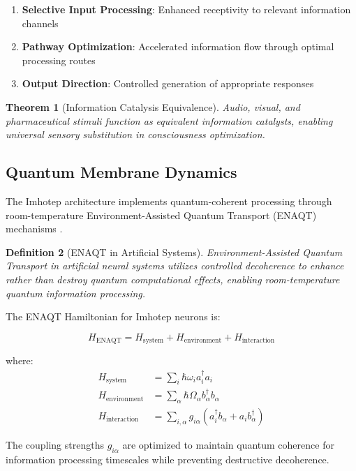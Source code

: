 \documentclass[12pt,a4paper]{article}
\newtheorem{theorem}{Theorem}[section]
\newtheorem{definition}[theorem]{Definition}
\theoremstyle{remark}
\begin{document}
\begin{enumerate}
\item \textbf{Selective Input Processing}: Enhanced receptivity to relevant information channels
\item \textbf{Pathway Optimization}: Accelerated information flow through optimal processing routes
\item \textbf{Output Direction}: Controlled generation of appropriate responses
\end{enumerate}

\begin{theorem}[Information Catalysis Equivalence]
Audio, visual, and pharmaceutical stimuli function as equivalent information catalysts, enabling universal sensory substitution in consciousness optimization.
\end{theorem}

\subsection{Quantum Membrane Dynamics}

The Imhotep architecture implements quantum-coherent processing through room-temperature Environment-Assisted Quantum Transport (ENAQT) mechanisms \cite{sachikonye2024membrane}.

\begin{definition}[ENAQT in Artificial Systems]
Environment-Assisted Quantum Transport in artificial neural systems utilizes controlled decoherence to enhance rather than destroy quantum computational effects, enabling room-temperature quantum information processing.
\end{definition}

The ENAQT Hamiltonian for Imhotep neurons is:

\begin{equation}
H_{\text{ENAQT}} = H_{\text{system}} + H_{\text{environment}} + H_{\text{interaction}}
\end{equation}

where:
\begin{align}
H_{\text{system}} &= \sum_{i} \hbar \omega_i a_i^\dagger a_i \\
H_{\text{environment}} &= \sum_{\alpha} \hbar \Omega_\alpha b_\alpha^\dagger b_\alpha \\
H_{\text{interaction}} &= \sum_{i,\alpha} g_{i\alpha} (a_i^\dagger b_\alpha + a_i b_\alpha^\dagger)
\end{align}

The coupling strengths $g_{i\alpha}$ are optimized to maintain quantum coherence for information processing timescales while preventing destructive decoherence.
\end{document}
